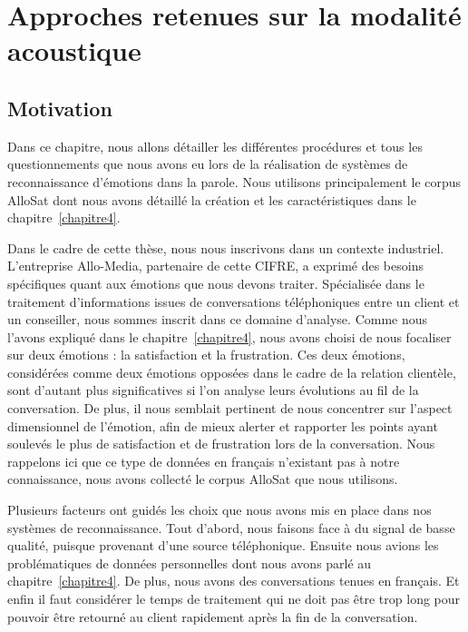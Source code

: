 \chapter{Approches retenues sur la modalité acoustique}
\label{chapitre5}

\section{Motivation}
Dans ce chapitre, nous allons détailler les différentes procédures et tous les questionnements que nous avons eu lors de la réalisation de systèmes de reconnaissance d'émotions dans la parole. Nous utilisons principalement le corpus AlloSat dont nous avons détaillé la création et les caractéristiques dans le chapitre~\ref{chapitre4}.

Dans le cadre de cette thèse, nous nous inscrivons dans un contexte industriel. L'entreprise Allo-Media, partenaire de cette CIFRE, a exprimé des besoins spécifiques quant aux émotions que nous devons traiter. Spécialisée dans le traitement d'informations issues de conversations téléphoniques entre un client et un conseiller, nous sommes inscrit dans ce domaine d'analyse. Comme nous l'avons expliqué dans le chapitre~\ref{chapitre4}, nous avons choisi de nous focaliser sur deux émotions : la satisfaction et la frustration. Ces deux émotions, considérées comme deux émotions opposées dans le cadre de la relation clientèle, sont d'autant plus significatives si l'on analyse leurs évolutions au fil de la conversation. De plus, il nous semblait pertinent de nous concentrer sur l'aspect dimensionnel de l'émotion, afin de mieux alerter et rapporter les points ayant soulevés le plus de satisfaction et de frustration lors de la conversation. Nous rappelons ici que ce type de données en français n'existant pas à notre connaissance, nous avons collecté le corpus AlloSat que nous utilisons.

Plusieurs facteurs ont guidés les choix que nous avons mis en place dans nos systèmes de reconnaissance. Tout d'abord, nous faisons face à du signal de basse qualité, puisque provenant d'une source téléphonique. Ensuite nous avions les problématiques de données personnelles dont nous avons parlé au chapitre~\ref{chapitre4}. De plus, nous avons des conversations tenues en français. Et enfin il faut considérer le temps de traitement qui ne doit pas être trop long pour pouvoir être retourné au client rapidement après la fin de la conversation.

